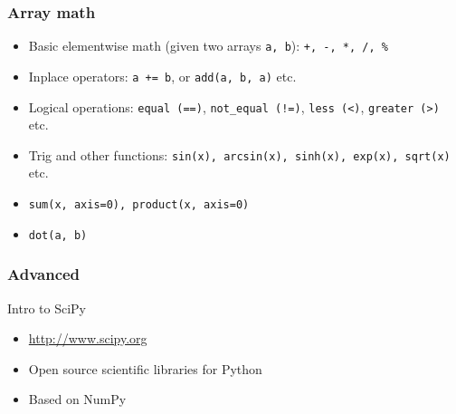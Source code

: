 \documentclass[14pt,compress]{beamer}
\newcounter{time}
\newcommand{\inctime}[1]{\addtocounter{time}{#1}{\tiny \thetime\ m}}
\newcommand{\typ}[1]{\texttt{#1}}
\begin{document}
\begin{frame}[fragile]
  \frametitle{Array math}
  \begin{itemize}
  \item Basic \alert{elementwise} math (given two arrays \typ{a, b}):
      \typ{+, -, *, /, \%}
  \item Inplace operators: \typ{a += b}, or \typ{add(a, b,
      a)} etc.
  \item Logical operations: \typ{equal (==)}, \typ{not\_equal (!=)},
    \typ{less (<)}, \typ{greater (>)} etc.
  \item Trig and other functions: \typ{sin(x), arcsin(x), sinh(x),
      exp(x), sqrt(x)} etc.
  \item \typ{sum(x, axis=0), product(x, axis=0)} 
  \item \typ{dot(a, b)}
  \end{itemize}
\end{frame}

\begin{frame}[fragile]
  \frametitle{Advanced}
  \inctime{15}
\end{frame}

\begin{frame}
    {Intro to SciPy}
  \begin{itemize}
  \item \url{http://www.scipy.org}
  \item Open source scientific libraries for Python
  \item Based on NumPy
    \end{itemize}

    \inctime{25}
\end{frame}
\end{document}
